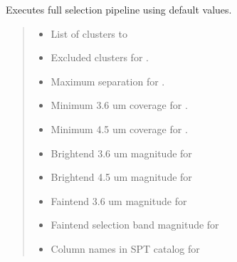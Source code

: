 \documentclass[letterpaper,12pt,english]{sphinxmanual}
\begin{document}
\begin{fulllineitems}
\begin{fulllineitems}
\pysigstopsignatures
\sphinxAtStartPar
Executes full selection pipeline using default values.
\begin{quote}\begin{description}
\begin{itemize}
\item {} 
\sphinxAtStartPar
{} \textendash{} List of clusters to

\item {} 
\sphinxAtStartPar
{} \textendash{} Excluded clusters for  {\hyperref[\detokenize{api/selector:SPTclIRAGN.Pipeline_functions.SelectFullFieldSDWFS.file_pairing}]{}}.

\item {} 
\sphinxAtStartPar
{} \textendash{} Maximum separation for .

\item {} 
\sphinxAtStartPar
{} \textendash{} Minimum 3.6 um coverage for .

\item {} 
\sphinxAtStartPar
{} \textendash{} Minimum 4.5 um coverage for .

\item {} 
\sphinxAtStartPar
{} \textendash{} Bright\sphinxhyphen{}end 3.6 um magnitude for 

\item {} 
\sphinxAtStartPar
{} \textendash{} Bright\sphinxhyphen{}end 4.5 um magnitude for 

\item {} 
\sphinxAtStartPar
{} \textendash{} Faint\sphinxhyphen{}end 3.6 um magnitude for 

\item {} 
\sphinxAtStartPar
{} \textendash{} Faint\sphinxhyphen{}end selection band magnitude for 

\item {} 
\sphinxAtStartPar
{} \textendash{} Column names in SPT catalog for {\hyperref[\detokenize{api/selector:SPTclIRAGN.Pipeline_functions.SelectFullFieldSDWFS.catalog_merge}]{}}


\end{itemize}
\end{description}
\end{quote}
\end{fulllineitems}
\end{fulllineitems}
\end{document}
